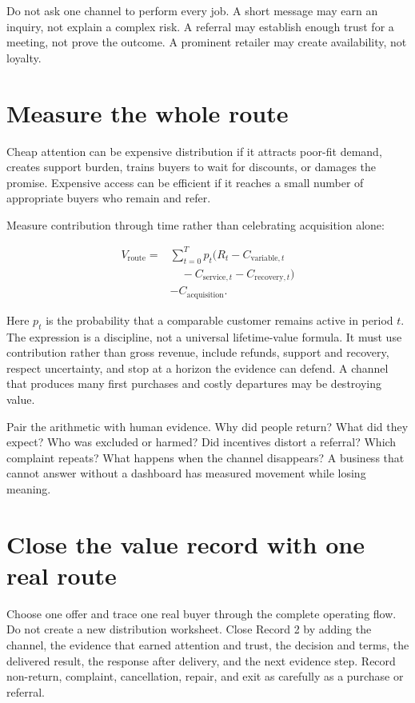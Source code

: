 Do not ask one channel to perform every job. A short message may earn an
inquiry, not explain a complex risk. A referral may establish enough trust for
a meeting, not prove the outcome. A prominent retailer may create availability,
not loyalty.

\section{Measure the whole route}

Cheap attention can be expensive distribution if it attracts poor-fit demand,
creates support burden, trains buyers to wait for discounts, or damages the
promise. Expensive access can be efficient if it reaches a small number of
appropriate buyers who remain and refer.

Measure contribution through time rather than celebrating acquisition alone:

\begin{equation}
\begin{aligned}
V_{\mathrm{route}}={}&\sum_{t=0}^{T} p_t
  \bigl(R_t-C_{\mathrm{variable},t}\\
&\quad-C_{\mathrm{service},t}-C_{\mathrm{recovery},t}\bigr)\\
&-C_{\mathrm{acquisition}}.
\end{aligned}
\end{equation}

Here \(p_t\) is the probability that a comparable customer remains active in
period \(t\). The expression is a discipline, not a universal lifetime-value
formula. It must use contribution rather than gross revenue, include refunds,
support and recovery, respect uncertainty, and stop at a horizon the evidence
can defend. A channel that produces many first purchases and costly departures
may be destroying value.

Pair the arithmetic with human evidence. Why did people return? What did they
expect? Who was excluded or harmed? Did incentives distort a referral? Which
complaint repeats? What happens when the channel disappears? A business that
cannot answer without a dashboard has measured movement while losing meaning.

\section{Close the value record with one real route}

Choose one offer and trace one real buyer through the complete operating flow.
Do not create a new distribution worksheet. Close Record 2 by adding the
channel, the evidence that earned attention and trust, the decision and terms,
the delivered result, the response after delivery, and the next evidence step.
Record non-return, complaint, cancellation, repair, and exit as carefully as a
purchase or referral.

